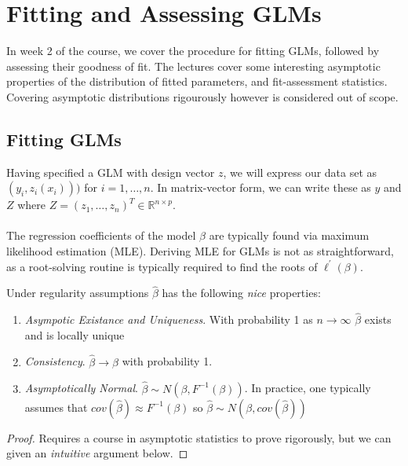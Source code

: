 
\section{Fitting and Assessing GLMs}
In week 2 of the course, we cover the procedure for fitting GLMs, followed by assessing their goodness of fit. The lectures cover some interesting asymptotic properties of the distribution of fitted parameters, and fit-assessment statistics. Covering asymptotic distributions rigourously however is considered out of scope.

\subsection{Fitting GLMs}
Having specified a GLM with design vector $z$, we will express our data set as $(y_i, z_i(x_i)))$ for $i=1,\dots,n$. In matrix-vector form, we can write these as $y$ and $Z$ where $Z = (z_1, \dots, z_n)^T\in\mathbb{R}^{n\times p}$. \\
\\
The regression coefficients of the model $\beta$ are typically found via maximum likelihood estimation (MLE). Deriving MLE for GLMs is not as straightforward, as a root-solving routine is typically required to find the roots of $\ell^\prime(\beta)$.

\begin{definition}
    
\end{definition}

\begin{theorem}
    Under regularity assumptions $\hat{\beta}$ has the following \textit{nice} properties:\begin{enumerate}
        \item \textit{Asympotic Existance and Uniqueness}. With probability 1 as $n\rightarrow\infty$ $\hat{\beta}$ exists and is locally unique
        \item \textit{Consistency}. $\hat{\beta}\rightarrow\beta$ with probability 1. 
        \item \textit{Asymptotically Normal}. $\hat{\beta}\sim N(\beta, F^{-1}(\beta))$. In practice, one typically assumes that $cov(\hat{\beta}) \approx F^{-1}(\beta)$ so $\hat{\beta}\sim N(\beta, cov(\hat{\beta}))$
    \end{enumerate}
\end{theorem}
\begin{proof}
    Requires a course in asymptotic statistics to prove rigorously, but we can given an \textit{intuitive} argument below.
\end{proof}

